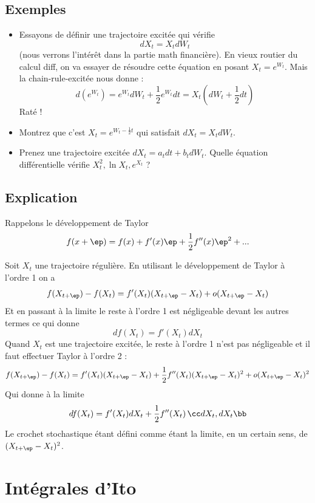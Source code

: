 \documentclass{article}
\begin{document}
\subsection{Exemples}

\begin{itemize}
\item Essayons de définir une trajectoire excitée qui vérifie $$dX_t = X_t dW_t$$ (nous verrons l'intérêt dans la partie math financière).  En vieux routier du calcul diff, on va essayer de résoudre cette équation en posant $X_t = e^{W_t}$. Mais la chain-rule-excitée nous donne :
$$
d  (e^{W_t})  =  e^{W_t}   dW_t + \frac 1 2   e^{W_t} dt = X_t (dW_t + \frac 1 2 dt  )
$$ 
Raté ! 
\item Montrez que c'est $X_t = e^{W_t - \frac 1 2 t}$ qui satisfait $dX_t = X_t dW_t$. 
\item Prenez une trajectoire excitée $dX_t = a_t dt + b_t dW_t$. Quelle équation différentielle vérifie $X^2_t, \ln X_t , e^{X_t}$ ?
\end{itemize}



\subsection{Explication}

Rappelons le développement de Taylor
$$
f(x+\ep) = f(x) + f'(x) \ep + \frac 1 2 f''(x) \ep^2 + ... 
$$


Soit $X_t$  une trajectoire régulière. En utilisant le développement de Taylor à l'ordre 1 on a 
$$
f(X_{t+\ep})  - f(X_t )  = f'(X_t)  (X_{t+\ep}-X_t )  +  o(  X_{t+\ep} -X_t  ) 
$$
Et en passant à la limite le reste à l'ordre 1 est négligeable devant les autres termes ce qui donne
$$
df(X_t) = f'(X_t) dX_t 
$$
Quand $X_t$ est une trajectoire excitée, le reste à l'ordre 1 n'est pas négligeable et il faut effectuer Taylor à l'ordre 2 :  
$$
f(X_{t+\ep})  - f(X_t )  =  f'(X_t)  (X_{t+\ep}-X_t )  +   \frac 12 f'' (X_t)  ( X_{t+\ep} -X_t )^2  +    o( X_{t+\ep} -X_t )^2 
$$
Qui donne à la limite
$$
df(X_t) =  f'(X_t) dX_t   +   \frac 1 2 f''(X_t) \, \cc dX_t, dX_t \bb
$$
Le crochet stochastique étant  défini comme étant la limite, en un certain sens, de $ (X_{t+\ep} -X_t )^2$.







\section{Intégrales d'Ito}
\end{document}
